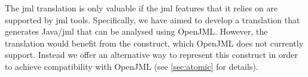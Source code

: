 The \ac{jml} translation is only valuable if the \ac{jml} features
that it relies on are supported by \ac{jml} tools. Specifically, we
have aimed to develop a translation that generates Java/\ac{jml} that
can be analysed using OpenJML. However, the translation would benefit
from the \invariantfor construct, which OpenJML does not currently
support. Instead we offer an alternative way to represent this
construct in order to achieve compatibility with OpenJML (see
\autoref{sec:atomic} for details).

